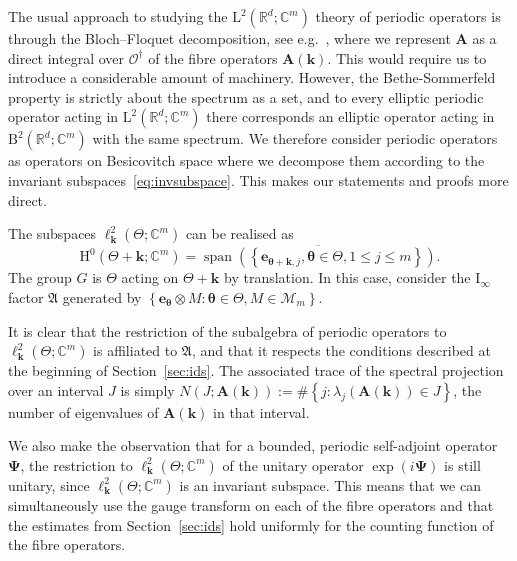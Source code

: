 \documentclass[AHL,Unicode,longabstracts,published]{cedram}
\DeclareMathOperator{\spann}{span}
\newcommand{\RB}{\mathrm{B}}
\newcommand{\RH}{\mathrm{H}}
\newcommand{\RL}{\mathrm{L}}
\newcommand{\rmI}{\mathrm{I}}
\newcommand{\R}{\mathbb R}
\newcommand{\C}{\mathbb C}
\newcommand{\CM}{\mathcal{M}}
\newcommand{\CO}{\mathcal{O}}
\newcommand{\BPsi}{\boldsymbol \Psi}
\newcommand{\btheta}{\boldsymbol \theta}
\newcommand{\BA}{\mathbf A}
\newcommand{\be}{\mathbf e}
\newcommand{\bk}{\mathbf k}
\newcommand{\FA}{\mathfrak A}
\newcommand{\set}[1]{\left\{ #1 \right\}}
\begin{document}
The usual approach to studying the $\RL^2(\R^d;\C^m)$ theory of periodic operators is through the Bloch--Floquet decomposition, see e.g.~\cite{Kuchment}, where we represent $\BA$ as a direct integral over $\CO^\dagger$ of the fibre operators $\BA(\bk)$. This would require us to introduce a considerable amount of machinery. However, the Bethe-Sommerfeld property is strictly about the spectrum as a set, and to every elliptic periodic operator acting in $\RL^2(\R^d;\C^m)$ there corresponds an elliptic operator acting in $\RB^2(\R^d;\C^m)$ with the same spectrum. We therefore consider periodic operators as operators on Besicovitch space where we decompose them according to the invariant subspaces~\eqref{eq:invsubspace}. This makes our statements and proofs more direct.
\begin{rema}\label{rem:Iinfinitybs}
The subspaces $\ell^2_\bk(\Theta;\C^m)$ can be realised as
\[
\RH^0(\Theta + \bk;\C^m) = \overline{\spann\left(\left\{\be_{\btheta + \bk,j},
\btheta \in \Theta, 1 \le j \le m\right\}\right)}.
\]
The group $G$ is $\Theta$ acting on
$\Theta + \bk$ by translation. In this case, consider the $\rmI_\infty$ factor $\FA$ generated by $
\set{\be_{\btheta} \otimes M: \btheta \in \Theta, M \in \CM_m}. $

It is clear that the restriction of the subalgebra of periodic operators to $\ell^2_\bk(\Theta;\C^m)$ is affiliated to $\FA$, and that it respects the conditions described at the beginning of Section~\ref{sec:ids}. The associated trace of the spectral projection over an interval $J$ is simply $N(J;\BA(\bk)) := \#\set{j : \lambda_j(\BA(\bk)) \in J}$, the number of eigenvalues of $\BA(\bk)$ in that interval.

We also make the observation that for a bounded, periodic self-adjoint operator~$\BPsi$, the restriction to $\ell^2_\bk(\Theta;\C^m)$ of the unitary operator $\exp(i \BPsi)$ is still unitary, since $\ell^2_\bk(\Theta;\C^m)$ is an invariant subspace. This means that we can simultaneously use the gauge transform on each of the fibre operators and that the estimates from Section~\ref{sec:ids} hold uniformly for the counting function of the fibre operators.
\end{rema}
\end{document}
